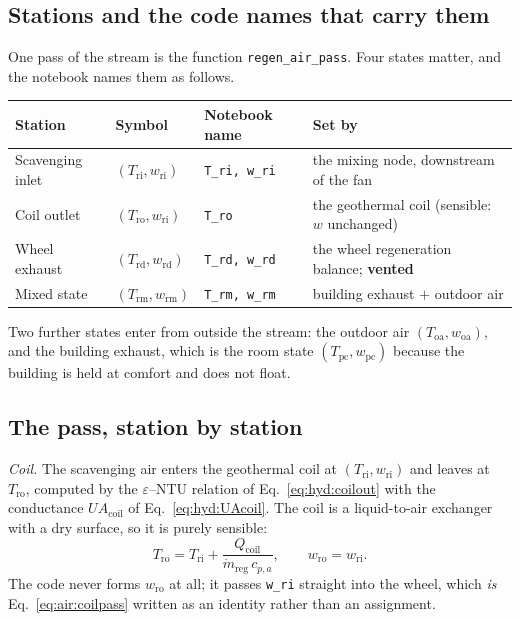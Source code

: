 \documentclass[11pt]{article}
\newcommand{\mdr}{\ensuremath{\dot m_{\mathrm{reg}}}}
\newcommand{\UA}{\ensuremath{U\!A}}
\begin{document}
\subsection{Stations and the code names that carry them}
\label{sec:air:stations}

One pass of the stream is the function \texttt{regen\_air\_pass}. Four states
matter, and the notebook names them as follows.

\begin{center}
\begin{tabular}{@{}llll@{}}
\toprule
Station & Symbol & Notebook name & Set by \\
\midrule
Scavenging inlet   & $(T_{\mathrm{ri}},w_{\mathrm{ri}})$ & \texttt{T\_ri, w\_ri} & the mixing node, downstream of the fan \\
Coil outlet        & $(T_{\mathrm{ro}},w_{\mathrm{ri}})$ & \texttt{T\_ro}        & the geothermal coil (sensible: $w$ unchanged) \\
Wheel exhaust      & $(T_{\mathrm{rd}},w_{\mathrm{rd}})$ & \texttt{T\_rd, w\_rd} & the wheel regeneration balance; \textbf{vented} \\
Mixed state        & $(T_{\mathrm{rm}},w_{\mathrm{rm}})$ & \texttt{T\_rm, w\_rm} & building exhaust $+$ outdoor air \\
\bottomrule
\end{tabular}
\end{center}

\noindent
Two further states enter from outside the stream: the outdoor air
$(T_{\mathrm{oa}},w_{\mathrm{oa}})$, and the building exhaust, which is the
room state $(T_{\mathrm{pc}},w_{\mathrm{pc}})$ because the building is held at
comfort and does not float.

\subsection{The pass, station by station}
\label{sec:air:pass}

\emph{Coil.} The scavenging air enters the geothermal coil at
$(T_{\mathrm{ri}},w_{\mathrm{ri}})$ and leaves at $T_{\mathrm{ro}}$, computed
by the $\varepsilon$--NTU relation of Eq.~\eqref{eq:hyd:coilout} with the
conductance $\UA_{\mathrm{coil}}$ of Eq.~\eqref{eq:hyd:UAcoil}. The coil is a
liquid-to-air exchanger with a dry surface, so it is purely sensible:
\begin{equation}
T_{\mathrm{ro}} = T_{\mathrm{ri}} + \frac{Q_{\mathrm{coil}}}{\mdr\,c_{p,a}},
\qquad
w_{\mathrm{ro}} = w_{\mathrm{ri}} .
\label{eq:air:coilpass}
\end{equation}
The code never forms $w_{\mathrm{ro}}$ at all; it passes \texttt{w\_ri}
straight into the wheel, which \emph{is} Eq.~\eqref{eq:air:coilpass} written
as an identity rather than an assignment.
\end{document}
